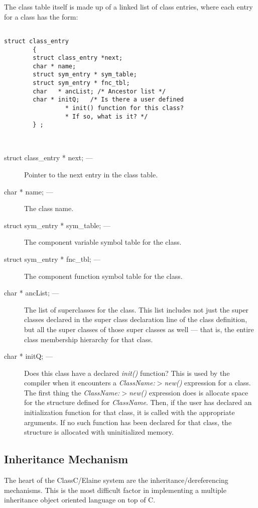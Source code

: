 The class table itself is made up of a linked list of class entries, where each
entry for a class has the form:
\begin{verbatim}

struct class_entry
	    {
		struct class_entry *next;
		char * name;
		struct sym_entry * sym_table;
		struct sym_entry * fnc_tbl;
		char   * ancList; /* Ancestor list */
		char * initQ;	/* Is there a user defined
				 * init() function for this class?
				 * If so, what is it? */
	    } ;



\end{verbatim}
\begin{description}

\item[ struct class\_entry * next; ---]

Pointer to the next entry in the class table.
\item[ char * name; ---]

The class name.
\item[struct sym\_entry * sym\_table; ---]

The component variable symbol table for the class.
\item[struct sym\_entry * fnc\_tbl; ---]

The component function symbol table for the class.
\item[char   * ancList; ---]

The list of superclasses for the class.  This list includes not just the
super classes declared in the super class declaration line of the class
definition, but all the super classes of those super classes as well --- that
is, the entire class membership hierarchy for that class.
\item[char * initQ; ---]

Does this class have a declared {\em init()} function?  This is used by the
compiler when it encounters a {\em ClassName:$>$new()} expression for a class.
The first thing the {\em ClassName:$>$new()} expression does is
allocate space for
the structure defined for {\em ClassName}.  Then, if the user has declared an
initialization function for that class, it is called with the appropriate
arguments.  If no such function has been declared for that class, the
structure is allocated with uninitialized memory.
\end{description}
\subsection{Inheritance Mechanism}
The heart of the ClassC/Elaine system are the inheritance/dereferencing
mechanisms.  This
is the most difficult factor in implementing a multiple inheritance object
oriented language on top of C.


